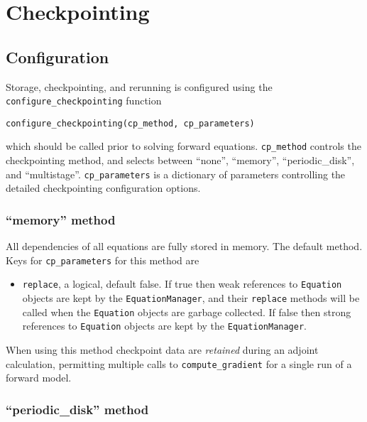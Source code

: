 \documentclass[11pt]{article}
\begin{document}
\section{Checkpointing}\label{sect:checkpointing}

\subsection{Configuration}\label{sect:configure_checkpointing}

Storage, checkpointing, and rerunning is configured using the
\texttt{configure\_checkpointing} function
\begin{lstlisting}
configure_checkpointing(cp_method, cp_parameters)
\end{lstlisting}
which should be called prior to solving forward equations. \texttt{cp\_method}
controls the checkpointing method, and selects between ``none'', ``memory'',
``periodic\_disk'', and ``multistage''. \texttt{cp\_parameters} is a dictionary
of parameters controlling the detailed checkpointing configuration options.

\subsubsection{``memory'' method}\label{sect:configure_checkpointing_memory}

All dependencies of all equations are fully stored in memory. The default
method. Keys for \texttt{cp\_parameters} for this method are
\begin{itemize}
  \item \texttt{replace}, a logical, default false. If true then weak
    references to \texttt{Equation} objects are kept by the
    \texttt{EquationManager}, and their \texttt{replace} methods will be called
    when the \texttt{Equation} objects are garbage collected. If false then
    strong references to \texttt{Equation} objects are kept by the
    \texttt{EquationManager}.
\end{itemize}

When using this method checkpoint data are \emph{retained} during an adjoint
calculation, permitting multiple calls to \texttt{compute\_gradient} for a
single run of a forward model.

\subsubsection{``periodic\_disk'' method}
\end{document}
